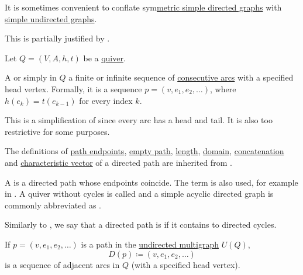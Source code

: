\begin{remark}\label{rem:symmetric_directed_graphs}
  It is sometimes convenient to conflate sym\hyperref[def:quiver/simple]{metric simple directed graphs} with \hyperref[def:undirected_multigraph]{simple undirected graphs}.

  This is partially justified by .
\end{remark}

\begin{definition}\label{def:quiver_path}
  Let \( Q = (V, A, h, t) \) be a \hyperref[def:quiver]{quiver}.

  \begin{thmenum}
     A  or simply  in \( Q \) a finite or infinite sequence of \hyperref[def:quiver/adjacency]{consecutive arcs} with a specified head vertex. Formally, it is a sequence \( p = (v, e_1, e_2, \ldots) \), where \( h(e_k) = t(e_{k-1}) \) for every index \( k \).

    This is a simplification of  since every arc has a head and tail. It is also too restrictive for some purposes.

    The definitions of \hyperref[def:undirected_multigraph_path/endpoints]{path endpoints}, \hyperref[def:undirected_multigraph_path/empty]{empty path}, \hyperref[def:undirected_multigraph_path/length]{length}, \hyperref[def:undirected_multigraph_path/domain]{domain}, \hyperref[def:undirected_multigraph_path/concatenation]{concatenation} and \hyperref[def:undirected_multigraph_path/characteristic_vector]{characteristic vector} of a directed path are inherited from .

     A  is a directed path whose endpoints coincide. The term  is also used, for example in \cite[ch. 1, sec. 3.2]{GondranMinoux1984Graphs}. A quiver without cycles is called  and a simple acyclic directed graph is commonly abbreviated as .

     Similarly to , we say that a directed path is  if it contains to directed cycles.

     If \( p = (v, e_1, e_2, \ldots) \) is a path in the \hyperref[def:undirected_multigraph]{undirected multigraph} \( U(Q) \),
    \begin{equation*}
      D(p) \coloneqq (v, e_1, e_2, \ldots)
    \end{equation*}
    is a sequence of adjacent arcs in \( Q \) (with a specified head vertex).


\end{thmenum}
\end{definition}
